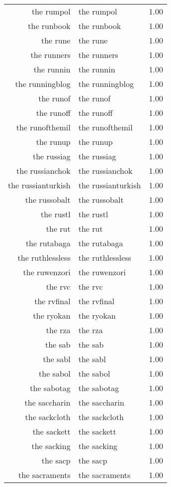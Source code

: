 \begin{table}[ht]
\begin{tabular}{rlr}
  the rumpol & the rumpol & 1.00 \\ 
  the runbook & the runbook & 1.00 \\ 
  the rune & the rune & 1.00 \\ 
  the runners & the runners & 1.00 \\ 
  the runnin & the runnin & 1.00 \\ 
  the runningblog & the runningblog & 1.00 \\ 
  the runof & the runof & 1.00 \\ 
  the runoff & the runoff & 1.00 \\ 
  the runofthemil & the runofthemil & 1.00 \\ 
  the runup & the runup & 1.00 \\ 
  the russiag & the russiag & 1.00 \\ 
  the russianchok & the russianchok & 1.00 \\ 
  the russianturkish & the russianturkish & 1.00 \\ 
  the russobalt & the russobalt & 1.00 \\ 
  the rustl & the rustl & 1.00 \\ 
  the rut & the rut & 1.00 \\ 
  the rutabaga & the rutabaga & 1.00 \\ 
  the ruthlessless & the ruthlessless & 1.00 \\ 
  the ruwenzori & the ruwenzori & 1.00 \\ 
  the rvc & the rvc & 1.00 \\ 
  the rvfinal & the rvfinal & 1.00 \\ 
  the ryokan & the ryokan & 1.00 \\ 
  the rza & the rza & 1.00 \\ 
  the sab & the sab & 1.00 \\ 
  the sabl & the sabl & 1.00 \\ 
  the sabol & the sabol & 1.00 \\ 
  the sabotag & the sabotag & 1.00 \\ 
  the saccharin & the saccharin & 1.00 \\ 
  the sackcloth & the sackcloth & 1.00 \\ 
  the sackett & the sackett & 1.00 \\ 
  the sacking & the sacking & 1.00 \\ 
  the sacp & the sacp & 1.00 \\ 
  the sacraments & the sacraments & 1.00 \\ 

\end{tabular}
\end{table}
